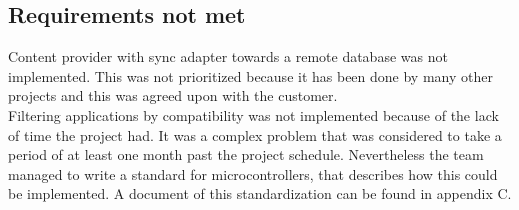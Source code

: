 		\subsection{Requirements not met}
			Content provider with sync adapter towards a remote database was not implemented. This was not prioritized because it has been done by many other projects and this was agreed upon with the customer. \\

			Filtering applications by compatibility was not implemented because of the lack of time the project had. It was a complex problem that was considered to take a period of at least one month past the project schedule. Nevertheless the team managed to write a standard for microcontrollers, that describes how this could be implemented. A document of this standardization can be found in appendix C. \\
